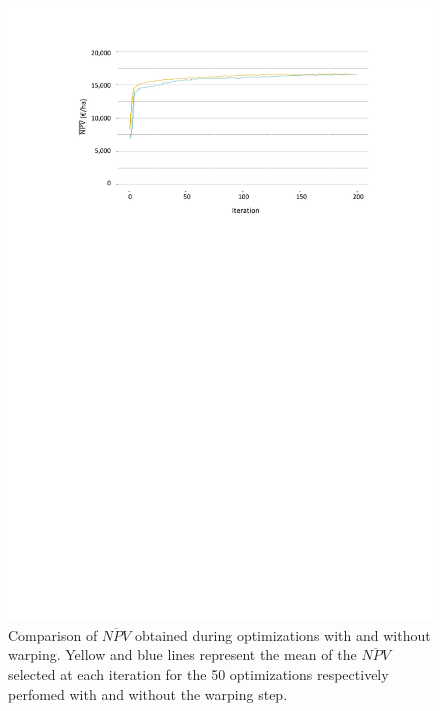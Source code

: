 	\begin{figure}[!ht]
		\centering
		\includegraphics[trim = 3.1cm 18.1cm 2.7cm 1.9cm, clip, width=\textwidth]{Figures_Warping_resultats_courbes_moyennes_mean_NPV_warping_sanswarping.pdf}
		\caption{Comparison of $\overline{NPV}$ obtained during optimizations with and without warping. 
			Yellow and blue lines represent the mean of the $\overline{NPV}$ selected at each iteration for the 50 optimizations respectively perfomed with and without the warping step. }\label{fig:moyennesNPV}
	\end{figure}
	
